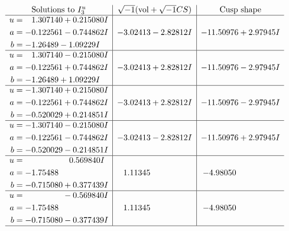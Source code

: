 \documentclass[1p]{elsarticle_modified}
\theoremstyle{definition}
\newcommand{\I}{\sqrt{-1}}
\begin{document}
$$\begin{array}{c|c|c}  
\text{Solutions to }I^u_{3}& \I (\text{vol} + \sqrt{-1}CS) & \text{Cusp shape}\\
 \hline 
\begin{aligned}
u &= \phantom{-}1.307140 + 0.215080 I \\
a &= -0.122561 - 0.744862 I \\
b &= -1.26489 - 1.09229 I\end{aligned}
 & -3.02413 - 2.82812 I & -11.50976 + 2.97945 I \\ \hline\begin{aligned}
u &= \phantom{-}1.307140 - 0.215080 I \\
a &= -0.122561 + 0.744862 I \\
b &= -1.26489 + 1.09229 I\end{aligned}
 & -3.02413 + 2.82812 I & -11.50976 - 2.97945 I \\ \hline\begin{aligned}
u &= -1.307140 + 0.215080 I \\
a &= -0.122561 + 0.744862 I \\
b &= -0.520029 + 0.214851 I\end{aligned}
 & -3.02413 + 2.82812 I & -11.50976 - 2.97945 I \\ \hline\begin{aligned}
u &= -1.307140 - 0.215080 I \\
a &= -0.122561 - 0.744862 I \\
b &= -0.520029 - 0.214851 I\end{aligned}
 & -3.02413 - 2.82812 I & -11.50976 + 2.97945 I \\ \hline\begin{aligned}
u &= \phantom{-0.000000 -}0.569840 I \\
a &= -1.75488\phantom{ +0.000000I} \\
b &= -0.715080 + 0.377439 I\end{aligned}
 & \phantom{-}1.11345\phantom{ +0.000000I} & -4.98050\phantom{ +0.000000I} \\ \hline\begin{aligned}
u &= \phantom{-0.000000 } -0.569840 I \\
a &= -1.75488\phantom{ +0.000000I} \\
b &= -0.715080 - 0.377439 I\end{aligned}
 & \phantom{-}1.11345\phantom{ +0.000000I} & -4.98050\phantom{ +0.000000I}\\
 \hline 
 \end{array}$$\newpage\newpage\renewcommand{\arraystretch}{1}
\end{document}
